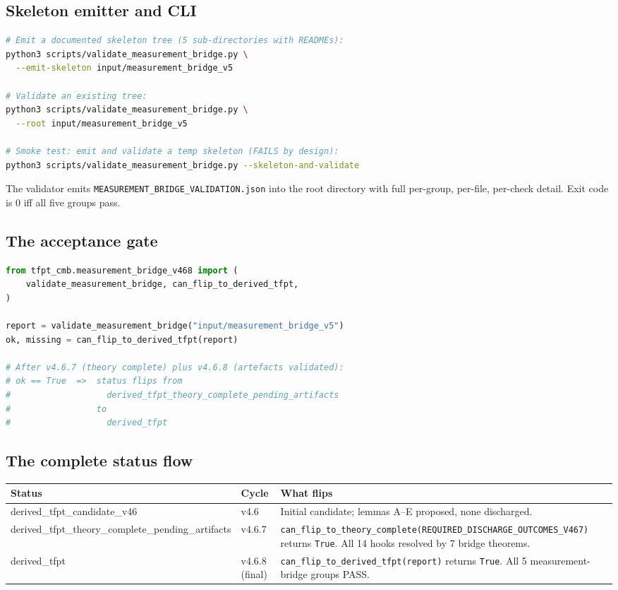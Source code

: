 \documentclass[11pt,a4paper]{article}
\begin{document}
\subsection{Skeleton emitter and CLI}

\begin{lstlisting}[language=bash]
# Emit a documented skeleton tree (5 sub-directories with READMEs):
python3 scripts/validate_measurement_bridge.py \
  --emit-skeleton input/measurement_bridge_v5

# Validate an existing tree:
python3 scripts/validate_measurement_bridge.py \
  --root input/measurement_bridge_v5

# Smoke test: emit and validate a temp skeleton (FAILS by design):
python3 scripts/validate_measurement_bridge.py --skeleton-and-validate
\end{lstlisting}

The validator emits \texttt{MEASUREMENT\_BRIDGE\_VALIDATION.json} into
the root directory with full per-group, per-file, per-check detail.
Exit code is 0 iff all five groups pass.

\subsection{The acceptance gate}

\begin{lstlisting}[language=Python]
from tfpt_cmb.measurement_bridge_v468 import (
    validate_measurement_bridge, can_flip_to_derived_tfpt,
)

report = validate_measurement_bridge("input/measurement_bridge_v5")
ok, missing = can_flip_to_derived_tfpt(report)

# After v4.6.7 (theory complete) plus v4.6.8 (artefacts validated):
# ok == True  =>  status flips from
#                   derived_tfpt_theory_complete_pending_artifacts
#                 to
#                   derived_tfpt
\end{lstlisting}

\subsection{The complete status flow}

\begin{center}
\renewcommand{\arraystretch}{1.18}
\begin{tabularx}{\textwidth}{@{}p{}lY@{}}
\toprule
\textbf{Status} & \textbf{Cycle} & \textbf{What flips} \\
\midrule
\textsf{derived\_tfpt\_candidate\_v46} & v4.6 &
Initial candidate; lemmas A--E proposed, none discharged. \\
\textsf{derived\_tfpt\_theory\_complete\_\allowbreak{}pending\_artifacts}
& v4.6.7 &
\texttt{can\_flip\_to\_theory\_complete(REQUIRED\_DISCHARGE\_OUTCOMES\_V467)} returns \texttt{True}. All 14 hooks resolved by 7 bridge theorems. \\
\textsf{derived\_tfpt} & v4.6.8 (final) &
\texttt{can\_flip\_to\_derived\_tfpt(report)} returns \texttt{True}.
All 5 measurement-bridge groups PASS. \\
\bottomrule
\end{tabularx}
\end{center}
\end{document}

